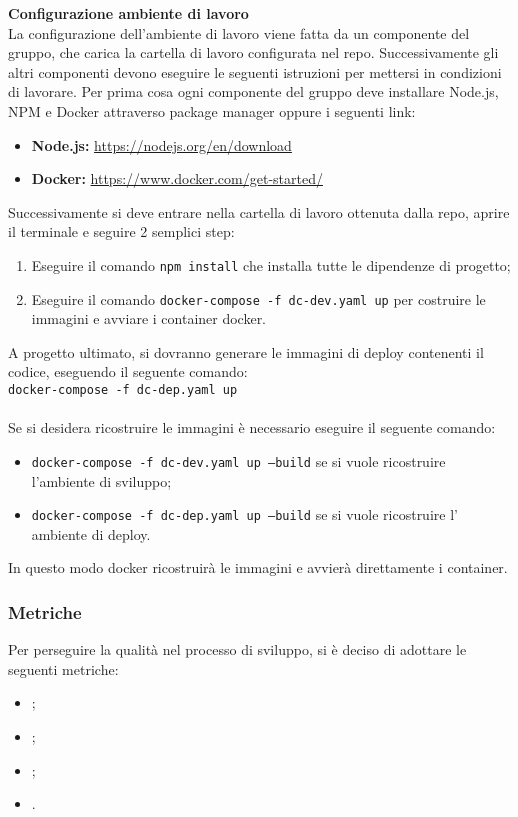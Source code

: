 \noindent \textbf{Configurazione ambiente di lavoro} \\
La configurazione dell’ambiente di lavoro viene fatta da un componente del gruppo, che carica la cartella
di lavoro configurata nel repo. Successivamente gli altri componenti devono eseguire le seguenti istruzioni
per mettersi in condizioni di lavorare. Per prima cosa ogni componente del gruppo deve installare Node.js, NPM e Docker
attraverso package manager oppure i seguenti link:
\begin{itemize}
    \item \textbf{Node.js:} \url{https://nodejs.org/en/download}
    \item \textbf{Docker:} \url{https://www.docker.com/get-started/}
\end{itemize}
Successivamente si deve entrare nella cartella di lavoro ottenuta dalla repo, aprire il terminale e seguire 2 semplici step:
\begin{enumerate}
    \item Eseguire il comando \texttt{npm install} che installa tutte le dipendenze di progetto;
    \item Eseguire il comando \texttt{docker-compose -f dc-dev.yaml up} per costruire le immagini e avviare i container docker.
\end{enumerate}
A progetto ultimato, si dovranno generare le immagini di deploy contenenti il codice, eseguendo il seguente comando:\\
\texttt{docker-compose -f dc-dep.yaml up}\\\\
Se si desidera ricostruire le immagini è necessario eseguire il seguente comando:\\
\begin{itemize}
    \item \texttt{docker-compose -f dc-dev.yaml up --build} se si vuole ricostruire l'ambiente di sviluppo;
    \item \texttt{docker-compose -f dc-dep.yaml up --build} se si vuole ricostruire l' ambiente di deploy.
\end{itemize}
In questo modo docker ricostruirà le immagini e avvierà direttamente i container.


\subsubsection{Metriche}
Per perseguire la qualità nel processo di sviluppo, si è deciso di adottare le
seguenti metriche:
\begin{itemize}
    \item {};
    \item {};
    \item {};
    \item {}.
\end{itemize}

